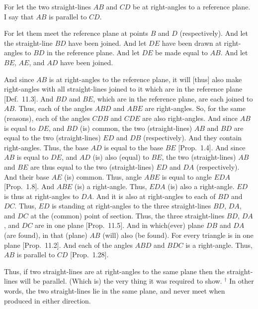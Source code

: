\centerline{}

For let the two straight-lines $AB$ and $CD$ be at right-angles
to a reference plane. I say that $AB$ is parallel to $CD$.

For let them meet the reference plane at points $B$ and $D$ (respectively).
And let the straight-line $BD$ have been joined. And let $DE$ have
been drawn at right-angles to $BD$ in the reference plane. And
let $DE$ be made equal to $AB$. And let $BE$, $AE$, and $AD$ have been joined.

And since $AB$ is at right-angles to the reference plane, it will [thus] also
make right-angles with all straight-lines joined to it which are in the
reference plane [Def.~11.3]. And
$BD$ and $BE$, which are in the reference plane, are each  joined to $AB$.
Thus, each of the angles $ABD$ and $ABE$ are right-angles. So, for the
same (reasons), each of the angles $CDB$ and $CDE$ are also right-angles.
And since $AB$ is equal to $DE$, and $BD$ (is) common, the two
(straight-lines) $AB$ and $BD$ are equal to the two (straight-lines) 
$ED$ and $DB$ (respectively). And they contain right-angles. Thus, the
base $AD$ is equal to the base $BE$ [Prop.~1.4].
And since $AB$ is equal to $DE$, and $AD$ (is) also (equal) to $BE$,  the two
(straight-lines) $AB$ and $BE$ are thus equal to the two (straight-lines) $ED$ and $DA$ (respectively). And their base $AE$ (is) common. Thus, angle $ABE$ is equal to angle $EDA$ [Prop.~1.8]. 
And $ABE$ (is) a right-angle. Thus, $EDA$ (is) also a right-angle.
$ED$ is thus at right-angles to $DA$.  And it is also at right-angles to
each of $BD$ and $DC$. Thus, $ED$ is standing at right-angles
to the three straight-lines $BD$, $DA$, and $DC$ at the (common)
point of section. Thus, the three straight-lines $BD$, $DA$,
and $DC$ are in one plane [Prop.~11.5]. And in
which(ever) plane $DB$ and $DA$ (are found), in that (plane) $AB$ (will) also (be found).
For every triangle is in one plane [Prop.~11.2].
And each of the angles $ABD$ and $BDC$ is a right-angle. Thus, $AB$ is
parallel to $CD$ [Prop.~1.28].

Thus, if  two straight-lines are at right-angles to the same
plane then the straight-lines will be parallel. (Which is) the very thing it
was required to show.
{\footnotesize\noindent$^\dag$ In other words,
the two straight-lines lie in the same plane, and never meet when
produced in either direction.}


